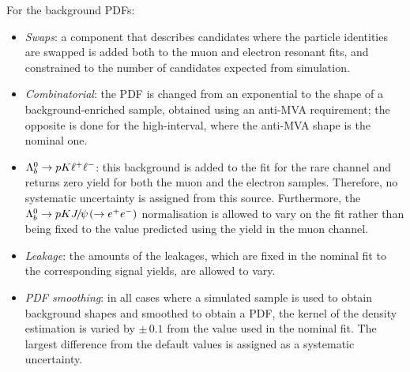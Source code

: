 For the background PDFs:
%
\begin{itemize}

\item \textit{Swaps}: a component that describes candidates where the particle identities are swapped
is added both to the muon and electron resonant fits, and constrained to the number of candidates
expected from simulation. 




\item \textit{Combinatorial}: the PDF is changed from an exponential to the shape of a background-enriched sample, obtained using 
an anti-MVA requirement; the opposite is done for the high-\qsq interval, where the anti-MVA shape is the nominal one. 

\item ${{\Lambda}^0_{b}}\rightarrow pK \ell^+ \ell^-$: this background is added to the fit for the rare channel and returns zero yield for both the muon 
and the electron samples. Therefore, no systematic uncertainty is assigned from this source. Furthermore, the $\Lb\to pK\jpsi(\to \ee)$ 
normalisation is allowed to vary on the fit rather than being fixed to the value predicted using the \Lb yield in the muon channel.

\item \textit{Leakage}: the amounts of the leakages, which are fixed in the nominal fit to the corresponding signal yields, are allowed to vary.

\item \textit{PDF smoothing}: in all cases where a simulated sample is used to obtain background shapes and smoothed to obtain a PDF,
the kernel of the density estimation is varied by $\pm\, 0.1$ from the value used in the nominal fit.
The largest difference from the default values is assigned as a systematic uncertainty.

\end{itemize}

